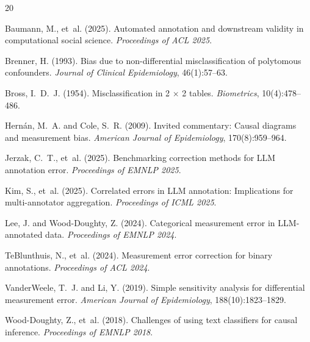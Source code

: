 \documentclass[11pt]{article}
\begin{document}

\begin{thebibliography}{20}

Baumann, M., et~al. (2025).
\newblock Automated annotation and downstream validity in computational social science.
\newblock \textit{Proceedings of ACL 2025}.

Brenner, H. (1993).
\newblock Bias due to non-differential misclassification of polytomous confounders.
\newblock \textit{Journal of Clinical Epidemiology}, 46(1):57--63.

Bross, I.~D.~J. (1954).
\newblock Misclassification in 2 $\times$ 2 tables.
\newblock \textit{Biometrics}, 10(4):478--486.

Hern\'{a}n, M.~A. and Cole, S.~R. (2009).
\newblock Invited commentary: Causal diagrams and measurement bias.
\newblock \textit{American Journal of Epidemiology}, 170(8):959--964.

Jerzak, C.~T., et~al. (2025).
\newblock Benchmarking correction methods for LLM annotation error.
\newblock \textit{Proceedings of EMNLP 2025}.

Kim, S., et~al. (2025).
\newblock Correlated errors in LLM annotation: Implications for multi-annotator aggregation.
\newblock \textit{Proceedings of ICML 2025}.

Lee, J. and Wood-Doughty, Z. (2024).
\newblock Categorical measurement error in LLM-annotated data.
\newblock \textit{Proceedings of EMNLP 2024}.

TeBlunthuis, N., et~al. (2024).
\newblock Measurement error correction for binary annotations.
\newblock \textit{Proceedings of ACL 2024}.

VanderWeele, T.~J. and Li, Y. (2019).
\newblock Simple sensitivity analysis for differential measurement error.
\newblock \textit{American Journal of Epidemiology}, 188(10):1823--1829.

Wood-Doughty, Z., et~al. (2018).
\newblock Challenges of using text classifiers for causal inference.
\newblock \textit{Proceedings of EMNLP 2018}.

\end{thebibliography}
\end{document}
